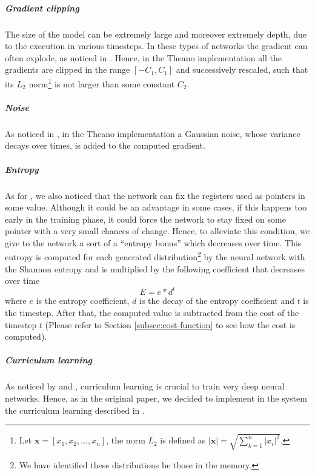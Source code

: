 \subparagraph{Gradient clipping}
The size of the model can be extremely large and moreover extremely depth, due to the execution in various timesteps. In these types of networks the gradient can often explode, as noticed in \cite{Bengio1994LearningLD}. Hence, in the Theano implementation all the gradients are clipped in the range $[-C_1, C_1]$ and successively rescaled, such that its $L_2$ norm\footnote{Let $\textbf{x} = [x_1, x_2, \dots, x_n]$, the norm $L_2$ is defined as $|\textbf{x}| = \sqrt{\sum\limits_{k=1}^{n}|x_i|^2}$.} is not larger than some constant $C_2$.

\subparagraph{Noise}
As noticed in \cite{Neelakantan2015AddingGN}, in the Theano implementation a Gaussian noise, whose variance decays over times, is added to the computed gradient.

\subparagraph{Entropy}
As for \cite{NRAM:2016}, we also noticed that the network can fix the registers used as pointers in some value. Although it could be an advantage in some cases, if this happens too early in the training phase, it could force the network to stay fixed on some pointer with a very small chances of change. Hence, to alleviate this condition, we give to the network a sort of a ``entropy bonus'' which decreases over time. This entropy is computed for each generated distribution\footnote{We have identified these distributions be those in the memory.} by the neural network with the Shannon entropy and is multiplied by the following coefficient that decreases over time
\begin{equation}
	E = e * d^{t}
\end{equation}
where $e$ is the entropy coefficient, $d$ is the decay of the entropy coefficient and $t$ is the timestep. After that, the computed value is subtracted from the cost of the timestep $t$ (Please refer to Section \ref{subsec:cost-function} to see how the cost is computed).

\subparagraph{Curriculum learning}\label{subpar:curriculum-learning}
As noticed by \cite{Bengio2009CurriculumL} and \cite{Zaremba2014LearningTE}, curriculum learning is crucial to train very deep neural networks. Hence, as in the original paper, we decided to implement in the system the curriculum learning described in \cite{Zaremba2014LearningTE}.

